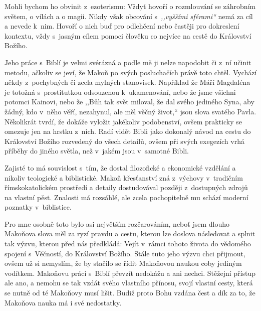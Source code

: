 Mohli bychom ho obvinit z~ezoterismu: Vždyť hovoří o rozmlouvání se záhrobním
světem, o vílách a o magii. Nikdy však obcování s~\textit{,,vyššími sférami``}
nemá za cíl a nevede k~nim. Hovoří o nich buď pro odlehčení nebo častěji pro
dokreslení kontextu, vždy s~jasným cílem pomoci člověku co nejvíce na cestě do
Království Božího.

Jeho práce s~Biblí je velmi svérázná a podle mě ji nelze napodobit či z~ní
učinit metodu, ačkoliv se jeví, že Makoň po svých posluchačích právě toto chtěl.
Vychází někdy z~pochybných či zcela mylných stanovisek. Například že Máří
Magdaléna je totožná s~prostitutkou odsouzenou k~ukamenování, nebo že jsme
všichni potomci Kainovi, nebo že ,,Bůh tak svět miloval, že dal svého jediného
Syna, aby žádný, kdo v~něho věří, nezahynul, ale měl věčný život,`` jsou slova
svatého Pavla. Několikrát tvrdí, že dokáže vyložit jakékoliv podobenství, ovšem
prakticky se omezuje jen na hrstku z~nich. Radí vidět Bibli jako dokonalý návod
na cestu do Království Božího rozvedený do všech detailů, ovšem při svých
exegezích vrhá příběhy do jiného světla, než v~jakém jsou v~samotné Bibli.

Zajisté to má souvislost s~tím, že dostal filozofické a ekonomické vzdělání a
nikoliv teologické a biblistické. Makoň křesťanství zná z~výchovy v~tradičním
římskokatolickém prostředí a detaily dostudovával později z~dostupných zdrojů na
vlastní pěst. Znalosti má rozsáhlé, ale zcela pochopitelně mu schází moderní
poznatky v~biblistice.

Pro mne osobně toto bylo asi největším rozčarováním, neboť jsem dlouho Makoňova
slova měl za ryzí pravdu a cestu, kterou lze doslova následovat a splnit tak
výzvu, kterou před nás předkládá: Vejít v~rámci tohoto života do vědomého
spojení s~Věčností, do Království Božího. Stále tuto jeho výzvu chci přijmout,
ovšem už si nemyslím, že by stačilo se řídit Makoňovou naukou coby jediným
vodítkem. Makoňovu práci s~Biblí převzít nedokážu a ani nechci. Stěžejní přístup
ale ano, a nemohu se tak vzdát svého vlastního přínosu, svojí vlastní cesty,
která se nutně od té Makoňovy musí lišit. Budiž proto Bohu vzdána čest a dík za
to, že Makoňova nauka má i své nedostatky.
